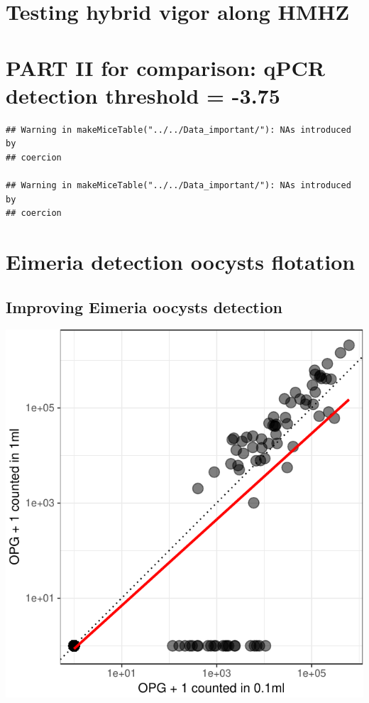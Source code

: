 \documentclass[]{article}
\begin{document}
\section{Testing hybrid vigor along
HMHZ}\label{testing-hybrid-vigor-along-hmhz}

\section{PART II for comparison: qPCR detection threshold =
-3.75}\label{part-ii-for-comparison-qpcr-detection-threshold--3.75}

\begin{verbatim}
## Warning in makeMiceTable("../../Data_important/"): NAs introduced by
## coercion

## Warning in makeMiceTable("../../Data_important/"): NAs introduced by
## coercion
\end{verbatim}

\section{Eimeria detection oocysts
flotation}\label{eimeria-detection-oocysts-flotation-1}

\subsection{Improving Eimeria oocysts
detection}\label{improving-eimeria-oocysts-detection-1}

\includegraphics{Data_Analysis_Alice_files/figure-latex/oocystsDetec_3.75-1.pdf}
\end{document}
